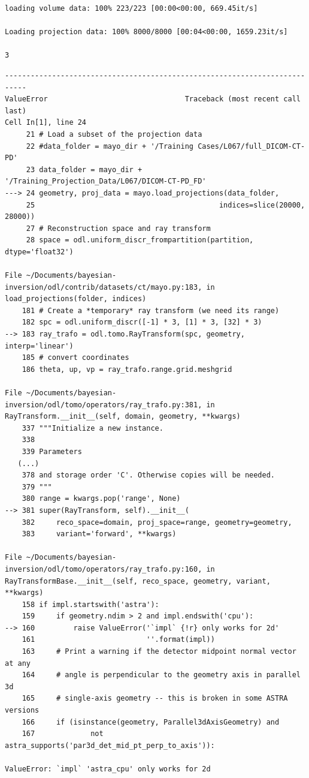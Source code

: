 \documentclass[a4paper, 11pt]{article}
\begin{document}
\begin{verbatim}
loading volume data: 100% 223/223 [00:00<00:00, 669.45it/s]

Loading projection data: 100% 8000/8000 [00:04<00:00, 1659.23it/s]

3
\end{verbatim}

\begin{verbatim}
---------------------------------------------------------------------------
ValueError                                Traceback (most recent call last)
Cell In[1], line 24
     21 # Load a subset of the projection data
     22 #data_folder = mayo_dir + '/Training Cases/L067/full_DICOM-CT-PD'
     23 data_folder = mayo_dir + '/Training_Projection_Data/L067/DICOM-CT-PD_FD'
---> 24 geometry, proj_data = mayo.load_projections(data_folder,
     25                                           indices=slice(20000, 28000))
     27 # Reconstruction space and ray transform
     28 space = odl.uniform_discr_frompartition(partition, dtype='float32')

File ~/Documents/bayesian-inversion/odl/contrib/datasets/ct/mayo.py:183, in load_projections(folder, indices)
    181 # Create a *temporary* ray transform (we need its range)
    182 spc = odl.uniform_discr([-1] * 3, [1] * 3, [32] * 3)
--> 183 ray_trafo = odl.tomo.RayTransform(spc, geometry, interp='linear')
    185 # convert coordinates
    186 theta, up, vp = ray_trafo.range.grid.meshgrid

File ~/Documents/bayesian-inversion/odl/tomo/operators/ray_trafo.py:381, in RayTransform.__init__(self, domain, geometry, **kwargs)
    337 """Initialize a new instance.
    338
    339 Parameters
   (...)
    378 and storage order 'C'. Otherwise copies will be needed.
    379 """
    380 range = kwargs.pop('range', None)
--> 381 super(RayTransform, self).__init__(
    382     reco_space=domain, proj_space=range, geometry=geometry,
    383     variant='forward', **kwargs)

File ~/Documents/bayesian-inversion/odl/tomo/operators/ray_trafo.py:160, in RayTransformBase.__init__(self, reco_space, geometry, variant, **kwargs)
    158 if impl.startswith('astra'):
    159     if geometry.ndim > 2 and impl.endswith('cpu'):
--> 160         raise ValueError('`impl` {!r} only works for 2d'
    161                          ''.format(impl))
    163     # Print a warning if the detector midpoint normal vector at any
    164     # angle is perpendicular to the geometry axis in parallel 3d
    165     # single-axis geometry -- this is broken in some ASTRA versions
    166     if (isinstance(geometry, Parallel3dAxisGeometry) and
    167             not astra_supports('par3d_det_mid_pt_perp_to_axis')):

ValueError: `impl` 'astra_cpu' only works for 2d
\end{verbatim}
\end{document}
